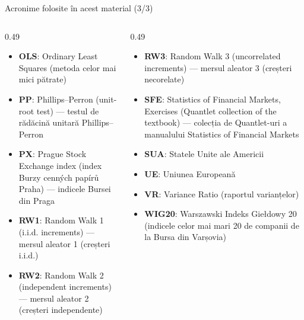 \begin{frame}{Acronime folosite în acest material (3/3)}
\begin{columns}[T]
\begin{column}{0.49\textwidth}
\begin{itemize}\setlength{\itemsep}{0pt}
    \item \textbf{OLS}: Ordinary Least Squares (metoda celor mai mici pătrate)
    \item \textbf{PP}: Phillips–Perron (unit-root test) — testul de rădăcină unitară Phillips–Perron
    \item \textbf{PX}: Prague Stock Exchange index (index Burzy cenných papírů Praha) — indicele Bursei din Praga
    \item \textbf{RW1}: Random Walk 1 (i.i.d. increments) — mersul aleator 1 (creșteri i.i.d.)
    \item \textbf{RW2}: Random Walk 2 (independent increments) — mersul aleator 2 (creșteri independente)
\end{itemize}
\end{column}
\begin{column}{0.49\textwidth}
\begin{itemize}\setlength{\itemsep}{0pt}
    \item \textbf{RW3}: Random Walk 3 (uncorrelated increments) — mersul aleator 3 (creșteri necorelate)
    \item \textbf{SFE}: Statistics of Financial Markets, Exercises (Quantlet collection of the textbook) — colecția de Quantlet-uri a manualului Statistics of Financial Markets
    \item \textbf{SUA}: Statele Unite ale Americii
    \item \textbf{UE}: Uniunea Europeană
    \item \textbf{VR}: Variance Ratio (raportul varianțelor)
    \item \textbf{WIG20}: Warszawski Indeks Giełdowy 20 (indicele celor mai mari 20 de companii de la Bursa din Varșovia)
\end{itemize}
\end{column}
\end{columns}
\end{frame}

